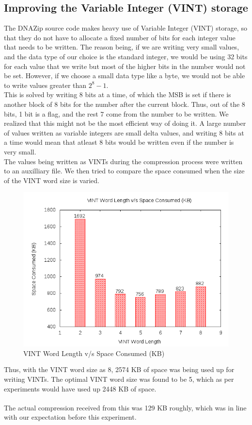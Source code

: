 \documentclass{article}
\begin{document}
\subsection {Improving the Variable Integer (VINT) storage}
The DNAZip source code makes heavy use of Variable Integer (VINT) storage, so that they do not have to allocate a fixed
number of bits for each integer value that needs to be written. The reason being, if we are writing very small values, and the data type of our choice is the standard integer, we would be using 32 bits for each value that we write but most of the higher bits in the number would not be set. However, if we choose a small data type like a byte, we would not be able to write values greater than $2^8 - 1$. \\
This is solved by writing 8 bits at a time, of which the MSB is set if there is another block of 8 bits for the number after the current block. Thus, out of the 8 bits, 1 bit is a flag, and the rest 7 come from the number to be written. We realized that this might not be the most efficient way of doing it. A large number of values written as variable integers are small delta values, and writing 8 bits at a time would mean that atleast 8 bits would be written even if the number is very small. \\
The values being written as VINTs during the compression process were written to an auxilliary file. We then tried to compare the space consumed when the size of the VINT word size is varied. 

\begin{figure}[htp]
\centering
\includegraphics[scale=0.4]{images/VINT.png}
\caption{VINT Word Length v/s Space Consumed (KB)}\label{fig:fs}
\end{figure}
\clearpage
Thus, with the VINT word size as 8, 2574 KB of space was being used up for writing VINTs. The optimal VINT word size was found to be 5, which as per experiments would have used up 2448 KB of space.\\
\\ 
The actual compression received from this was 129 KB roughly, which was in line with our expectation before this experiment.\\
\clearpage
\end{document}
